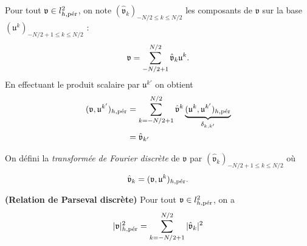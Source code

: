 Pour tout $\mathfrak{v} \in l^2_{h,\per}$, on note $(\hat{\mathfrak{v}}_k )_{-N/2 \leq k \leq N/2}$ les composants de $\mathfrak{v}$ sur la base $(\mathfrak{u}^k)_{-N/2 +1 \leq k \leq N/2}$ :
\begin{equation}
\mathfrak{v} = \gsum_{-N/2+1}^{N/2} \hat{\mathfrak{v}}_k \mathfrak{u}^k.
\end{equation}
En effectuant le produit scalaire par $\mathfrak{u}^{k'}$ on obtient
\begin{align*}
(\mathfrak{v}, \mathfrak{u}^{k'})_{h,\per} & = \gsum_{k=-N/2+1}^{N/2} \hat{\mathfrak{v}}^k \underbrace{(\mathfrak{u}^k, \mathfrak{u}^{k'})_{h,\per}}_{\delta_{k,k'}} \\
		& = \hat{\mathfrak{v}}_{k'}
\end{align*}

\begin{definition}
On défini la \textit{transformée de Fourier discrète} de $\mathfrak{v}$ par $(\hat{\mathfrak{v}}_{k})_{-N/2+1 \leq k \leq N/2}$ où
\begin{equation}
\hat{\mathfrak{v}}_{k} = (\mathfrak{v}, \mathfrak{u}^{k})_{h,\per}.
\end{equation}
\end{definition}

\begin{proposition}
\textbf{(Relation de Parseval discrète)} 
Pour tout $\mathfrak{v} \in l^2_{h,\per}$, on a 
\begin{equation}
|\mathfrak{v}|_{h,\per}^2 = \gsum_{k=-N/2+1}^{N/2} |\hat{\mathfrak{v}}_k|^2
\end{equation}
\end{proposition}

